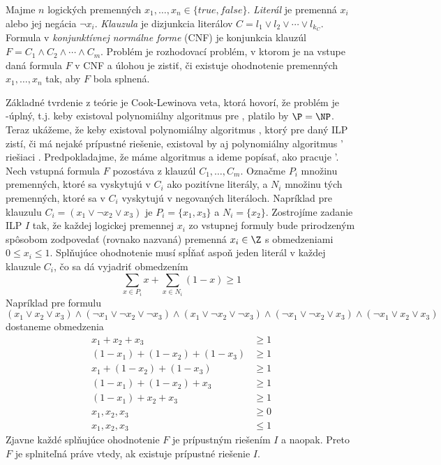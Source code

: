 \begin{framed}
  \begin{dfn}
    \label{dfn:sat}
    Majme $n$ logických premenných $x_1,\ldots,x_n\in\{true,false\}$. {\em
    Literál} je premenná $x_i$ alebo jej negácia $\neg{x_i}$. {\em Klauzula} je
    dizjunkcia literálov $C=l_1\vee l_2\vee\cdots\vee l_{k_C}$.  Formula v {\em
    konjunktívnej normálne forme} (CNF) je konjunkcia klauzúl $F=C_1\wedge
    C_2\wedge\cdots\wedge C_m$. Problém \sat je rozhodovací problém, v ktorom
    je na vstupe daná formula $F$  v CNF a úlohou je zistiť, či existuje
    ohodnotenie premenných $x_1,\ldots,x_n$ tak, aby $F$ bola splnená.
  \end{dfn}
\end{framed}

\noindent Základné tvrdenie z teórie je Cook-Lewinova veta, ktorá hovorí, že
problém \sat je \NP-úplný, t.j. keby existoval polynomiálny algoritmus pre
\sat, platilo by $\P=\NP$.  Teraz ukážeme, že keby existoval polynomiálny
algoritmus \algA, ktorý pre daný ILP zistí, či má nejaké prípustné riešenie,
existoval by aj polynomiálny algoritmus \algA' riešiaci \sat.  Predpokladajme,
že máme algoritmus \algA a ideme popísať, ako pracuje \algA'.  Nech vstupná
formula $F$ pozostáva z klauzúl $C_1,\ldots,C_m$. Označme $P_i$ množinu
premenných, ktoré sa vyskytujú v $C_i$ ako pozitívne literály, a $N_i$ množinu
tých premenných, ktoré sa v $C_i$ vyskytujú v negovaných literáloch. Napríklad
pre klauzulu $C_i=(x_1\vee\neg{x_2}\vee x_3)$ je $P_i=\{x_1,x_3\}$ a
$N_i=\{x_2\}$.  Zostrojíme zadanie ILP $I$ tak, že každej logickej premennej
$x_i$ zo vstupnej formuly bude prirodzeným spôsobom zodpovedať (rovnako
nazvaná) premenná $x_i\in\Z$ s obmedzeniami $0\le x_i\le1$.  Splňujúce
ohodnotenie musí spĺňať aspoň jeden literál v každej klauzule $C_i$, čo sa dá
vyjadriť obmedzením
$$\sum_{x\in P_i}x + \sum_{x\in N_i}(1-x) \ge 1$$
Napríklad pre formulu
$$(x_1\vee x_2\vee x_3)\wedge(\neg{x_1}\vee\neg{x_2}\vee\neg{x_3})\wedge(x_1\vee\neg{x_2}\vee\neg{x_3})\wedge(\neg{x_1}\vee\neg{x_2}\vee x_3)\wedge(\neg{x_1}\vee x_2\vee x_3)$$
dostaneme obmedzenia
\begin{align*}
  x_1+x_2+x_3&\ge1\\
  (1-x_1)+(1-x_2)+(1-x_3)&\ge1\\
  x_1+(1-x_2)+(1-x_3)&\ge1\\
  (1-x_1)+(1-x_2)+x_3&\ge1\\
  (1-x_1)+x_2+x_3&\ge1\\
  x_1,x_2,x_3&\ge0\\
  x_1,x_2,x_3&\le1
\end{align*}
Zjavne každé splňujúce ohodnotenie $F$ je prípustným riešením $I$ a naopak.
Preto $F$ je splniteľná práve vtedy, ak existuje prípustné riešenie $I$.

